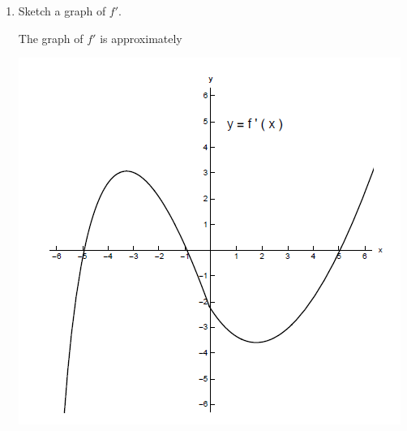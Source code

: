 \documentclass[nooutcomes,handout]{ximera}
\begin{document}
\begin{problem}
\begin{enumerate}
\begin{enumerate}
      \end{enumerate}

      \item
      Sketch a graph of $f'$.
      \begin{freeResponse}
        The graph of $f'$ is approximately
        \begin{image}
          \includegraphics[scale = 0.7]{Figure2.png}
        \end{image}
      \end{freeResponse}
  \end{enumerate}
\end{problem}
\end{document}

